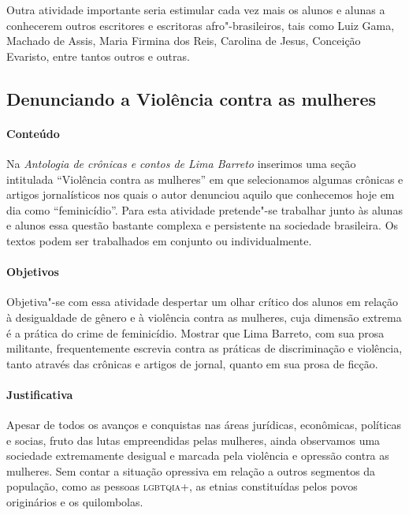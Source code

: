 \documentclass[11pt]{extarticle}
\begin{document}
{{Outra atividade importante seria estimular cada vez mais os alunos e
alunas a conhecerem outros escritores e escritoras afro"-brasileiros,
tais como Luiz Gama, Machado de Assis, Maria Firmina dos Reis, Carolina
de Jesus, Conceição Evaristo, entre tantos outros e outras.


\subsection{Denunciando a Violência contra as mulheres}




\paragraph{Conteúdo} Na \emph{Antologia de crônicas e contos de Lima
Barreto} inserimos uma seção intitulada ``Violência contra as mulheres''
em que selecionamos algumas crônicas e artigos jornalísticos nos quais o
autor denunciou aquilo que conhecemos hoje em dia como ``feminicídio''.
Para esta atividade pretende"-se trabalhar junto às alunas e alunos essa
questão bastante complexa e persistente na sociedade brasileira. Os
textos podem ser trabalhados em conjunto ou individualmente.

\paragraph{Objetivos} Objetiva"-se com essa atividade despertar um olhar
crítico dos alunos em relação à desigualdade de gênero e à violência
contra as mulheres, cuja dimensão extrema é a prática do crime de
feminicídio. Mostrar que Lima Barreto, com sua prosa militante,
frequentemente escrevia contra as práticas de discriminação e violência,
tanto através das crônicas e artigos de jornal, quanto em sua prosa de
ficção.


\paragraph{Justificativa} Apesar de todos os avanços e conquistas nas
áreas jurídicas, econômicas, políticas e socias, fruto das lutas
empreendidas pelas mulheres, ainda observamos uma sociedade extremamente
desigual e marcada pela violência e opressão contra as mulheres. Sem
contar a situação opressiva em relação a outros segmentos da população, 
como as pessoas \textsc{lgbtqia}+, as etnias constituídas pelos povos
originários e os quilombolas.

}}
\end{document}
